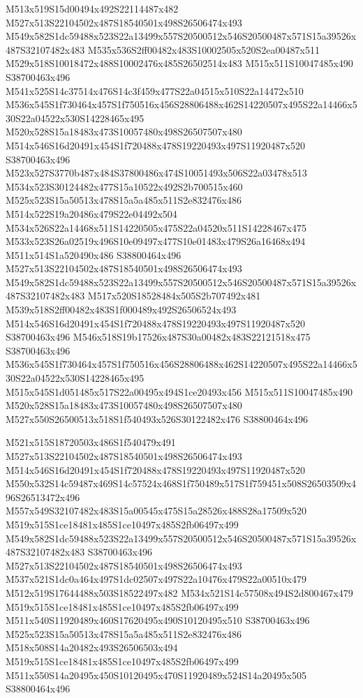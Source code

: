\documentclass{article}
\begin{document}
\begin{multicols}{2}
M513x519S15d00494x492S22114487x482 M527x513S22104502x487S18540501x498S26506474x493 M549x582S1dc59488x523S22a13499x557S20500512x546S20500487x571S15a39526x487S32107482x483 M535x536S2ff00482x483S10002505x520S2ea00487x511 M529x518S10018472x488S10002476x485S26502514x483 M515x511S10047485x490 S38700463x496 M541x525S14c37514x476S14c3f459x477S22a04515x510S22a14472x510 M536x545S1f730464x457S1f750516x456S28806488x462S14220507x495S22a14466x530S22a04522x530S14228465x495 M520x528S15a18483x473S10057480x498S26507507x480 M514x546S16d20491x454S1f720488x478S19220493x497S11920487x520 S38700463x496 M523x527S3770b487x484S37800486x474S10051493x506S22a03478x513 M534x523S30124482x477S15a10522x492S2b700515x460 M525x523S15a50513x478S15a5a485x511S2e832476x486 M514x522S19a20486x479S22e04492x504 M534x526S22a14468x511S14220505x475S22a04520x511S14228467x475 M533x523S26a02519x496S10e09497x477S10e01483x479S26a16468x494 M511x514S1a520490x486 S38800464x496 M527x513S22104502x487S18540501x498S26506474x493 M549x582S1dc59488x523S22a13499x557S20500512x546S20500487x571S15a39526x487S32107482x483 M517x520S18528484x505S2b707492x481 M539x518S2ff00482x483S1f000489x492S26506524x493 M514x546S16d20491x454S1f720488x478S19220493x497S11920487x520 S38700463x496 M546x518S19b17526x487S30a00482x483S22121518x475 S38700463x496 M536x545S1f730464x457S1f750516x456S28806488x462S14220507x495S22a14466x530S22a04522x530S14228465x495 M515x545S1d051485x517S22a00495x494S1ce20493x456 M515x511S10047485x490 M520x528S15a18483x473S10057480x498S26507507x480 M527x550S26500513x518S1f540493x526S30122482x476 S38800464x496

M521x515S18720503x486S1f540479x491 M527x513S22104502x487S18540501x498S26506474x493 M514x546S16d20491x454S1f720488x478S19220493x497S11920487x520 M550x532S14c59487x469S14c57524x468S1f750489x517S1f759451x508S26503509x496S26513472x496 M557x549S32107482x483S15a00545x475S15a28526x488S28a17509x520 M519x515S1ce18481x485S1ce10497x485S2fb06497x499 M549x582S1dc59488x523S22a13499x557S20500512x546S20500487x571S15a39526x487S32107482x483 S38700463x496 M527x513S22104502x487S18540501x498S26506474x493 M537x521S1dc0a464x497S1dc02507x497S22a10476x479S22a00510x479 M512x519S17644488x503S18522497x482 M534x521S14c57508x494S2d800467x479 M519x515S1ce18481x485S1ce10497x485S2fb06497x499 M511x540S11920489x460S17620495x490S10120495x510 S38700463x496 M525x523S15a50513x478S15a5a485x511S2e832476x486 M518x508S14a20482x493S26506503x494 M519x515S1ce18481x485S1ce10497x485S2fb06497x499 M511x550S14a20495x450S10120495x470S11920489x524S14a20495x505 S38800464x496


\end{multicols}
\end{document}
